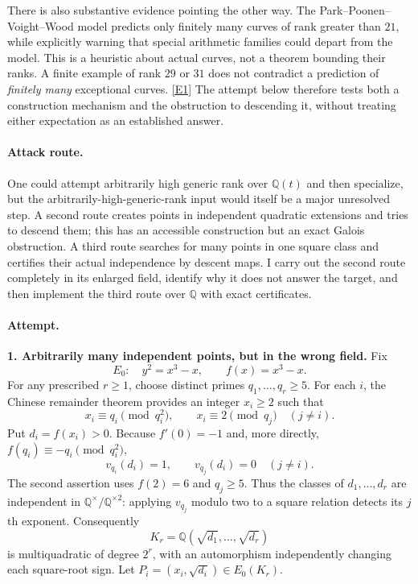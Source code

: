 \documentclass[11pt,a4paper]{article}
\newcommand{\Q}{\mathbb{Q}}
\newcommand{\eref}[2]{\hyperlink{extra:#1:#2}{[E#2]}}
\numberwithin{equation}{section}
\begin{document}
There is also substantive evidence pointing the other way. The
Park--Poonen--Voight--Wood model predicts only finitely many curves of rank
greater than $21$, while explicitly warning that special arithmetic families
could depart from the model. This is a heuristic about actual curves, not
a theorem bounding their ranks. A finite example of rank $29$ or $31$ does
not contradict a prediction of \emph{finitely many} exceptional curves.
\eref{30006731}{1} The attempt below therefore tests both a construction mechanism
and the obstruction to descending it, without treating either expectation
as an established answer.

\paragraph{Attack route.}
One could attempt arbitrarily high generic rank over $\Q(t)$ and then
specialize, but the arbitrarily-high-generic-rank input would itself be a
major unresolved step. A second route creates points in independent quadratic
extensions and tries to descend them; this has an accessible construction
but an exact Galois obstruction. A third route searches for many points in
one square class and certifies their actual independence by descent maps.
I carry out the second route completely in its enlarged field, identify why
it does not answer the target, and then implement the third route over
$\Q$ with exact certificates.

\paragraph{Attempt.}
\textbf{1. Arbitrarily many independent points, but in the wrong field.}
Fix
\[
 E_0:\quad y^2=x^3-x,
 \qquad f(x)=x^3-x.
\]
For any prescribed $r\geq1$, choose distinct primes $q_1,\ldots,q_r\geq5$.
For each $i$, the Chinese remainder theorem provides an integer $x_i\geq2$
such that
\begin{equation}\label{30006731:crt}
 x_i\equiv q_i\pmod{q_i^2},\qquad
 x_i\equiv2\pmod{q_j}\quad(j\neq i).
\end{equation}
Put $d_i=f(x_i)>0$. Because $f'(0)=-1$ and, more directly,
$f(q_i)\equiv-q_i\pmod{q_i^2}$,
\[
 v_{q_i}(d_i)=1,\qquad v_{q_j}(d_i)=0\quad(j\neq i).
\]
The second assertion uses $f(2)=6$ and $q_j\geq5$. Thus the classes of
$d_1,\ldots,d_r$ are independent in $\Q^\times/\Q^{\times2}$: applying
$v_{q_j}$ modulo two to a square relation detects its $j$th exponent.
Consequently
\[
 K_r=\Q(\sqrt{d_1},\ldots,\sqrt{d_r})
\]
is multiquadratic of degree $2^r$, with an automorphism independently
changing each square-root sign. Let $P_i=(x_i,\sqrt{d_i})\in E_0(K_r)$.
\end{document}
